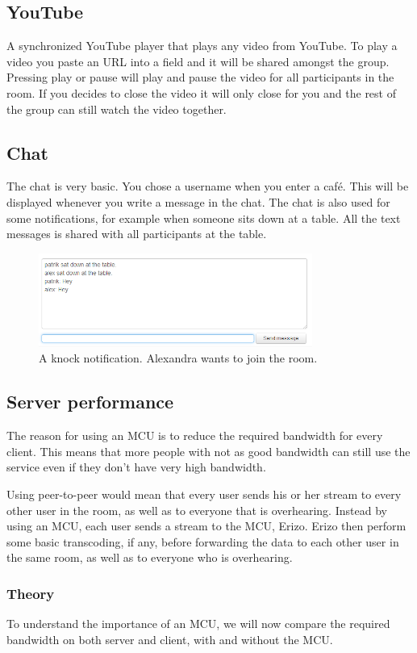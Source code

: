 \documentclass[12pt, titlepage]{article}
\begin{document}
\subsection{YouTube}
A synchronized YouTube player that plays any video from YouTube. To play a video you paste an URL into a field and it will be shared amongst the group. Pressing play or pause will play and pause the video for all participants in the room. If you decides to close the video it will only close for you and the rest of the group can still watch the video together.
\subsection{Chat}
The chat is very basic. You chose a username when you enter a café. This will be displayed whenever you write a message in the chat. The chat is also used for some notifications, for example when someone sits down at a table. All the text messages is shared with all participants at the table.
\begin{figure}[H]
  \centering
	\includegraphics[width=0.8\textwidth,keepaspectratio]{chat.png}
  \caption{A knock notification. Alexandra wants to join the room.}
\end{figure}
\subsection{Server performance}
The reason for using an MCU is to reduce the required bandwidth for every client. This means that more people with not as good bandwidth can still use the service even if they don't have very high bandwidth. 

Using peer-to-peer would mean that every user sends his or her stream to every other user in the room, as well as to everyone that is overhearing. Instead by using an MCU, each user sends a stream to the MCU, Erizo. Erizo then perform some basic transcoding, if any, before forwarding the data to each other user in the same room, as well as to everyone who is overhearing.

\subsubsection{Theory}
To understand the importance of an MCU, we will now compare the required bandwidth on both server and client, with and without the MCU.
\end{document}
